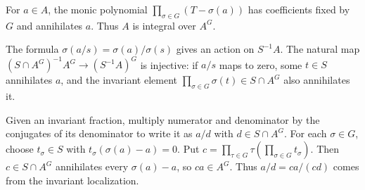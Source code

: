 For $a\in A$, the monic polynomial $\prod_{\sigma\in G}(T-\sigma(a))$ has coefficients fixed by $G$ and annihilates $a$. Thus $A$ is integral over $A^G$.

The formula $\sigma(a/s)=\sigma(a)/\sigma(s)$ gives an action on $S^{-1}A$. The natural map $(S\cap A^G)^{-1}A^G\to(S^{-1}A)^G$ is injective: if $a/s$ maps to zero, some $t\in S$ annihilates $a$, and the invariant element $\prod_{\sigma\in G}\sigma(t)\in S\cap A^G$ also annihilates it.

Given an invariant fraction, multiply numerator and denominator by the conjugates of its denominator to write it as $a/d$ with $d\in S\cap A^G$. For each $\sigma\in G$, choose $t_\sigma\in S$ with $t_\sigma(\sigma(a)-a)=0$. Put $c=\prod_{\tau\in G}\tau(\prod_{\sigma\in G}t_\sigma)$. Then $c\in S\cap A^G$ annihilates every $\sigma(a)-a$, so $ca\in A^G$. Thus $a/d=ca/(cd)$ comes from the invariant localization.
